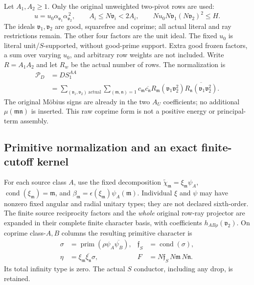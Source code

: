 Let $A_1,A_2\ge1$. Only the original unweighted two-pivot rows are used:
\[
 u=u_0\alpha_{\mathfrak v_1}\alpha_{\mathfrak v_2}^{\,2},\qquad
 A_i\le N\mathfrak v_i<2A_i,\qquad
 Nu_0N\mathfrak v_1(N\mathfrak v_2)^2\le H.
\]
The ideals $\mathfrak v_1,\mathfrak v_2$ are good, squarefree and
coprime; all actual literal and ray restrictions remain. The other
four factors are the unit ideal. The fixed $u_0$ is literal
unit/$S$-supported, without good-prime support. Extra good frozen
factors, a sum over varying $u_0$, and arbitrary row weights are not
included. Write $R=A_1A_2$ and let $R_w$ be the actual number of rows.
The normalization is
\begin{equation}\label{cbk:normalization}
 \begin{aligned}
 \mathcal P_D&=D S_1^{AA}\\
 &=\sum_{(\mathfrak v_1,\mathfrak v_2)\ \mathrm{actual}}
   \sum_{(\mathfrak m,\mathfrak n)=1}
 c_{\mathfrak m}\overline{c_{\mathfrak n}}
 R_{\mathfrak m}(\mathfrak v_1\mathfrak v_2^2)
 \overline{R_{\mathfrak n}(\mathfrak v_1\mathfrak v_2^2)}.
 \end{aligned}
\end{equation}
The original M\"obius signs are already in the two $A_U$ coefficients;
no additional $\mu(\mathfrak m\mathfrak n)$ is inserted.
This raw coprime form is not a positive energy or principal-term
assembly.

\subsection{Primitive normalization and an exact finite-cutoff kernel}
\label{cbk:primitive-kernel}
For each source class $A$, use the fixed decomposition
$\widetilde\chi_{\mathfrak m}=\xi_{\mathfrak m}\psi_A$,
$\operatorname{cond}(\xi_{\mathfrak m})=\mathfrak m$, and
$\beta_{\mathfrak m}=\epsilon(\xi_{\mathfrak m})\psi_A(\mathfrak m)$.
Individual $\xi$ and $\psi$ may have nonzero fixed angular and radial
unitary types; they are not declared sixth-order.
The finite source reciprocity factors and the \emph{whole} original
row-ray projector are expanded in their complete finite character
basis, with coefficients $h_{AB\rho}(\mathfrak v_2)$.
On coprime class-$A,B$ columns the resulting primitive character is
\begin{equation}\label{cbk:eta}
 \begin{aligned}
 \sigma&=\operatorname{prim}(\rho\psi_A\overline{\psi_B}),
 &\mathfrak f_S&=\operatorname{cond}(\sigma),\\
 \eta&=\xi_{\mathfrak m}\overline{\xi_{\mathfrak n}}\sigma,
 &F&=N\mathfrak f_S\,N\mathfrak m\,N\mathfrak n.
 \end{aligned}
\end{equation}
Its total infinity type is zero. The actual $S$ conductor, including
any drop, is retained.


